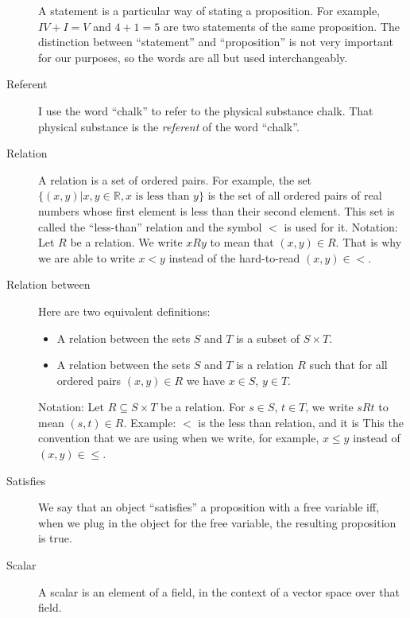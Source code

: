 \documentclass[12pt]{article}
\begin{document}
\begin{description}
    A statement is a particular way of stating a proposition.  For
    example, $IV+I=V$ and $4+1=5$ are two statements of the same
    proposition.  The distinction between ``statement'' and
    ``proposition'' is not very important for our purposes, so the
    words are all but used interchangeably.

  \item[Referent] I use the word ``chalk'' to refer to the physical
    substance chalk.  That physical substance is the \textit{referent}
    of the word ``chalk''.
    
  \item[Relation] A relation is a set of ordered pairs.  For example,
    the set $\{(x,y)|x,y\in\mathbb{R}, x\textrm{ is less than }y\}$ is
    the set of all ordered pairs of real numbers whose first element
    is less than their second element.  This set is called the
    ``less-than'' relation and the symbol $<$ is used for it.
    Notation: Let $R$ be a relation.  We write $xRy$ to mean that
    $(x,y)\in R$.  That is why we are able to write $x<y$ instead of
    the hard-to-read $(x,y)\in <$.
  
  \item[Relation between] Here are two equivalent definitions:
    \begin{itemize}
    \item A relation between the sets $S$ and $T$ is a subset of $S\times T$.
    \item A relation between the sets $S$ and $T$ is a relation $R$
      such that for all ordered pairs $(x,y)\in R$ we have $x\in S$, $y\in T$.
    \end{itemize}
    Notation: Let $R\subseteq S\times T$ be a relation.  For $s\in S$,
    $t\in T$, we write $sRt$ to mean $(s,t)\in R$. 
    Example:  $<$ is the less than relation, and it is This the
    convention that we are using when we write, for example, $x\leq y$
    instead of $(x,y)\in\leq$.


  \item[Satisfies] We say that an object ``satisfies'' a proposition
    with a free variable iff, when we plug in the object for the free
    variable, the resulting proposition is true.

  \item[Scalar] A scalar is an element of a field, in the context of a
    vector space over that field.


\end{description}
\end{document}
